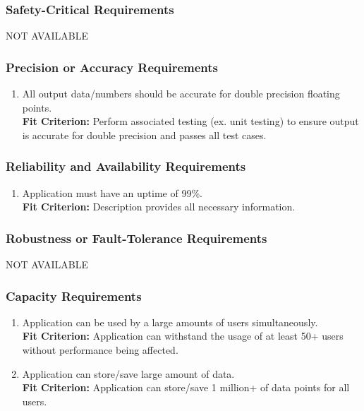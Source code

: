 \documentclass[12pt,letterpaper]{article}
\begin{document}
\subsubsection{Safety-Critical Requirements}
\noindent NOT AVAILABLE

\subsubsection{Precision or Accuracy Requirements}
\begin{enumerate}[resume*] 
	\item All output data/numbers should be accurate for double precision floating points.\\
	{\textbf{Fit Criterion:} Perform associated testing (ex. unit testing) to ensure output is accurate for double precision and passes all test cases. }
\end{enumerate}

\subsubsection{Reliability and Availability Requirements}
\begin{enumerate}[resume*] 
	\item Application must have an uptime of 99\%.\\
	{\textbf{Fit Criterion:} Description provides all necessary information. }
\end{enumerate}

\subsubsection{Robustness or Fault-Tolerance Requirements}
\noindent NOT AVAILABLE

\subsubsection{Capacity Requirements}
\begin{enumerate}[resume*] 
	\item Application can be used by a large amounts of users simultaneously.\\
	{\textbf{Fit Criterion:} Application can withstand the usage of at least 50+ users without performance being affected. }
	\item Application can store/save large amount of data.\\
	{\textbf{Fit Criterion:} Application can store/save 1 million+ of data points for all users. }
\end{enumerate}
\end{document}
